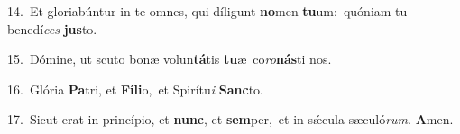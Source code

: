 {\numbfont\textcolor{\numbcolor}{14.}}~Et gloriabúntur in te omnes, qui díligunt \textbf{no}\-men \textbf{tu}\-um:~\star quóniam tu benedí\textit{ces} \textbf{jus}\-to.\par
{\numbfont\textcolor{\numbcolor}{15.}}~Dómine, ut scuto bonæ volun\-\textbf{tá}\-tis \textbf{tu}\-æ~\star co\-\textit{ro}\-\textbf{nás}ti nos.\par
{\numbfont\textcolor{\numbcolor}{16.}}~Glória \textbf{Pa}\-tri, et \textbf{Fí}\-\textbf{li}o,~\star et Spirítu\textit{i} \textbf{Sanc}\-to.\par
{\numbfont\textcolor{\numbcolor}{17.}}~Sicut erat in princípio, et \textbf{nunc}\-, et \textbf{sem}\-per,~\star et in sǽcula sæculó\-\textit{rum}\-. \textbf{A}\-men.\par
